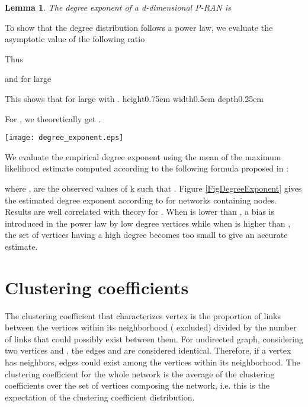 \documentclass[11pt]{iopart}
\newtheorem{lemma}[theorem]{Lemma}
\newenvironment{proof}[1][Proof]{\begin{trivlist}
    \item[\hskip \labelsep {\bfseries #1}]}{\end{trivlist}}
\newcommand{\qed}{\nobreak \ifvmode \relax \else
          \ifdim\lastskip<1.5em \hskip-\lastskip
          \hskip1.5em plus0em minus0.5em \fi \nobreak
          \vrule height0.75em width0.5em depth0.25em\fi}
\begin{document}
\begin{lemma}
The degree exponent of a d-dimensional P-RAN is 
\end{lemma}

\begin{proof}
To show that the degree distribution follows a power law, we evaluate the asymptotic value of the following ratio


Thus




and for large 



This shows that for large   with .
\qed
\end{proof}

For , we theoretically get  .

\begin{figure*}[htbp]
\centering
\texttt{[image: degree\_exponent.eps]}
\caption{Degree exponent estimation for a 2-dimensional P-RAN containing 200000 vertices according to Eq.\ref{degreeExponentEstimate}}
\label{FigDegreeExponent}
\end{figure*}

We evaluate the empirical degree exponent using the mean of the maximum likelihood estimate computed according to the following formula proposed in \cite{clauset-2007} :

where ,  are the observed values of k such that .
Figure \ref{FigDegreeExponent} gives the estimated degree exponent according to  for networks containing  nodes. Results are well correlated with theory for . When  is lower than , a bias is introduced in the power law by low degree vertices while when  is higher than , the set of vertices having a high degree becomes too small to give an accurate estimate. 

\section{Clustering coefficients}
The clustering coefficient  that characterizes vertex  is the proportion of links between the vertices within its neighborhood ( excluded) divided by the number of links that could possibly exist between them. For undirected graph, considering two vertices  and , the edges  and  are considered identical. Therefore, if a vertex  has  neighbors,  edges could exist among the vertices within its neighborhood. The clustering coefficient for the whole network is the average of the clustering coefficients  over the set of vertices composing the network, i.e. this is the expectation of the clustering coefficient distribution.
\end{document}
